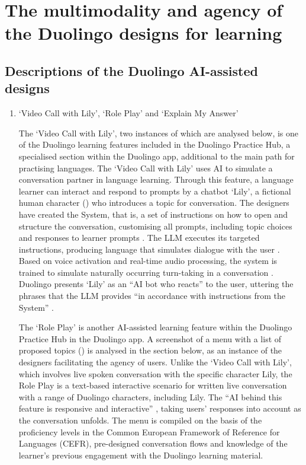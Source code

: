 \documentclass[english]{textolivre}
\begin{document}
\section{The multimodality and agency of the Duolingo designs for learning}\label{sec-formato}
\subsection{Descriptions of the Duolingo AI-assisted designs}

\begin{enumerate}[label=\Alph*.]
    \item ‘Video Call with Lily’, ‘Role Play’ and ‘Explain My Answer’

The ‘Video Call with Lily’, two instances of which are analysed below, is one of the Duolingo learning features included in the Duolingo Practice Hub, a specialised section within the Duolingo app, additional to the main path for practising languages. The ‘Video Call with Lily’ uses AI to simulate a conversation partner in language learning. Through this feature, a language learner can interact and respond to prompts by a chatbot ‘Lily’, a fictional human character () who introduces a topic for conversation. The designers have created the System, that is, a set of instructions on how to open and structure the conversation, customising all prompts, including topic choices and responses to learner prompts \cite{henry2025lily,zenml2025structured}. The LLM executes its targeted instructions, producing language that simulates dialogue with the user \cite{henry2025lily}. Based on voice activation and real-time audio processing, the system is trained to simulate naturally occurring turn-taking in a conversation \cite{wallingford2025call}. Duolingo presents ‘Lily’ as an “AI bot who reacts” to the user, uttering the phrases that the LLM provides “in accordance with instructions from the System” \cite[para. 4]{henry2025lily}.

The ‘Role Play’ is another AI-assisted learning feature within the Duolingo Practice Hub in the Duolingo app. A screenshot of a menu with a list of proposed topics () is analysed in the section below, as an instance of the designers facilitating the agency of users. Unlike the ‘Video Call with Lily’, which involves live spoken conversation with the specific character Lily, the Role Play is a text-based interactive scenario for written live conversation with a range of Duolingo characters, including Lily. The “AI behind this feature is responsive and interactive” \cite[para. 5]{duolingo2024videocall}, taking users’ responses into account as the conversation unfolds. The menu is compiled on the basis of the proficiency levels in the Common European Framework of Reference for Languages (CEFR), pre-designed conversation flows and knowledge of the learner’s previous engagement with the Duolingo learning material.


\end{enumerate}
\end{document}
